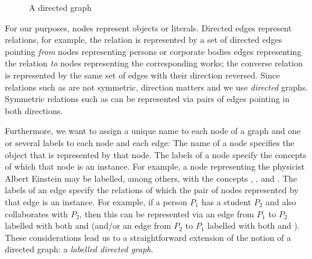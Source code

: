 \begin{figure}[ht]
  \centering
  \caption{A directed graph}
  \label{fig:example_graph_abstract}
\end{figure}

For our purposes,
nodes represent objects or literals. 
Directed edges represent relations, 
for example, 
the relation  is represented by a set of directed edges
pointing \emph{from} nodes representing persons or corporate bodies
edges representing the relation
\emph{to} nodes representing the corresponding works;
the converse relation  is represented by the same set of edges 
with their direction reversed.
Since relations such as  are not symmetric,
direction matters and we use \emph{directed} graphs. 
Symmetric relations such as 
can be represented via pairs of edges pointing in both directions.

\goodbreak
Furthermore, we want to assign a unique name to each node of a graph
and one or several labels to each node and each edge:
The name of a node specifies the object that is represented by that node.
The labels of a node specify the concepts
of which that node is an instance.
For example, a node representing the physicist Albert Einstein
may be labelled, among others, with the concepts , ,
and .
The labels of an edge specify the relations of which the pair of nodes
represented by that edge is an instance.
For example, if a person $P_1$ has a student $P_2$ and also 
collaborates with $P_2$, then this can be represented via an edge from $P_1$ to $P_2$
labelled with both  and 
(and/or an edge from $P_2$ to $P_1$ labelled with both  and ).
These considerations lead us to a straightforward extension
of the notion of a directed graph:
a \emph{labelled directed graph}.

